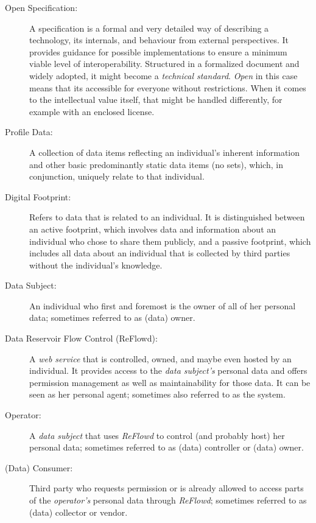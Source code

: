 \documentclass[12pt,english,a4paper,titlepage,cleardoublepage=empty,dottedtoc]{report}
\begin{document}
\begin{description}
\item[Open Specification:]
A specification is a formal and very detailed way of describing a
technology, its internals, and behaviour from external perspectives. It
provides guidance for possible implementations to ensure a minimum
viable level of interoperability. Structured in a formalized document
and widely adopted, it might become a \emph{technical standard}.
\emph{Open} in this case means that its accessible for everyone without
restrictions. When it comes to the intellectual value itself, that might
be handled differently, for example with an enclosed license.
\item[\protect\hypertarget{terminologies--profile-data}{}{Profile
Data}:]
A collection of data items reflecting an individual's inherent
information and other basic predominantly static data items (no sets),
which, in conjunction, uniquely relate to that individual.
\item[\protect\hypertarget{terminologies--digital-footprint}{}{Digital
Footprint}:]
Refers to data that is related to an individual. It is distinguished
between an active footprint, which involves data and information about
an individual who chose to share them publicly, and a passive footprint,
which includes all data about an individual that is collected by third
parties without the individual's knowledge.
\item[Data Subject:]
An individual who first and foremost is the owner of all of her personal
data; sometimes referred to as (data) owner.
\item[Data Reservoir Flow Control (ReFlowd):]
A \emph{web service} that is controlled, owned, and maybe even hosted by
an individual. It provides access to the \emph{data subject's} personal
data and offers permission management as well as maintainability for
those data. It can be seen as her personal agent; sometimes also
referred to as the system.
\item[\protect\hypertarget{terminologies--operator}{}{Operator}:]
A \emph{data subject} that uses \emph{ReFlowd} to control (and probably
host) her personal data; sometimes referred to as (data) controller or
(data) owner.
\item[\protect\hypertarget{terminologies--consumer}{}{(Data) Consumer}:]
Third party who requests permission or is already allowed to access
parts of the \emph{operator's} personal data through \emph{ReFlowd};
sometimes referred to as (data) collector or vendor.
\end{description}
\end{document}
